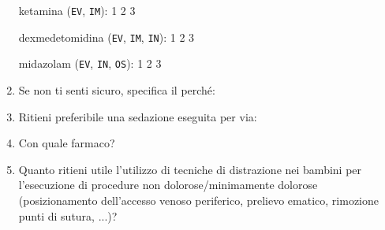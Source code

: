 \begin{tcolorbox}
\begin{enumerate}
               ketamina (\texttt{EV}, \texttt{IM}): \colorbox{xkcdCloudyBlue!10}{1} \colorbox{xkcdCloudyBlue!10}{2} \colorbox{xkcdCloudyBlue!10}{3}
               
               dexmedetomidina (\texttt{EV}, \texttt{IM}, \texttt{IN}): \colorbox{xkcdCloudyBlue!10}{1} \colorbox{xkcdCloudyBlue!10}{2} \colorbox{xkcdCloudyBlue!10}{3}
               
               midazolam (\texttt{EV}, \texttt{IN}, \texttt{OS}): \colorbox{xkcdCloudyBlue!10}{1} \colorbox{xkcdCloudyBlue!10}{2} \colorbox{xkcdCloudyBlue!10}{3}

           \item Se non ti senti sicuro, specifica il perché: 
           \item Ritieni preferibile una sedazione eseguita per via:
           
           \item Con quale farmaco?
           
           \item Quanto ritieni utile l’utilizzo di tecniche di distrazione nei bambini per l’esecuzione di procedure non dolorose/minimamente dolorose (posizionamento dell'accesso venoso periferico, prelievo ematico, rimozione punti di sutura, ...)?
           

\end{enumerate}
\end{tcolorbox}
